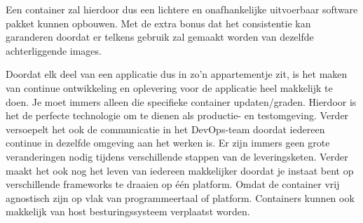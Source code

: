 Een container zal hierdoor dus een lichtere en onafhankelijke uitvoerbaar software pakket kunnen opbouwen. Met de extra bonus dat het consistentie kan garanderen doordat er telkens gebruik zal gemaakt worden van dezelfde achterliggende images. ~\autocite{DockerContainer}

Doordat elk deel van een applicatie dus in zo'n appartementje zit, is het maken van continue ontwikkeling en oplevering voor de applicatie heel makkelijk te doen. Je moet immers alleen die specifieke container updaten/graden. Hierdoor is het de perfecte technologie om te dienen als productie- en testomgeving. Verder versoepelt het ook de communicatie in het DevOps-team doordat iedereen continue in dezelfde omgeving aan het werken is. Er zijn immers geen grote veranderingen nodig tijdens verschillende stappen van de leveringsketen. Verder maakt het ook nog het leven van iedereen makkelijker doordat je instaat bent op verschillende frameworks te draaien op één platform. Omdat de container vrij agnostisch zijn op vlak van programmeertaal of platform. Containers kunnen ook makkelijk van host besturingssysteem verplaatst worden.  ~\autocite{DevOpsContainers}

